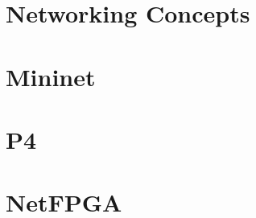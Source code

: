 \section{Networking Concepts}
\label{networking_concepts_research}



\section{Mininet}
\label{mininet}


\section{P4}
\label{p4}


\section{NetFPGA}
\label{netfpga}

